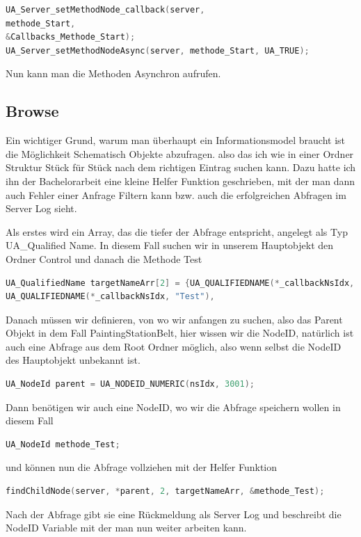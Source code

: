 \begin{lstlisting}[language=C]
UA_Server_setMethodNode_callback(server,
methode_Start,
&Callbacks_Methode_Start);
UA_Server_setMethodNodeAsync(server, methode_Start, UA_TRUE);
\end{lstlisting}

Nun kann man die Methoden Asynchron aufrufen.

\subsection{Browse}
Ein wichtiger Grund, warum man überhaupt ein Informationsmodel braucht ist die Möglichkeit Schematisch Objekte abzufragen. also das ich wie in einer Ordner Struktur Stück für Stück nach dem richtigen Eintrag suchen kann. Dazu hatte ich ihn der Bachelorarbeit eine kleine Helfer Funktion geschrieben, mit der man dann auch Fehler einer Anfrage Filtern kann bzw. auch die erfolgreichen Abfragen im Server Log sieht.

Als erstes wird ein Array, das die tiefer der Abfrage entspricht, angelegt als Typ UA\_Qualified Name. In diesem Fall suchen wir in unserem Hauptobjekt den Ordner Control und danach die Methode Test

\begin{lstlisting}[language=C]
UA_QualifiedName targetNameArr[2] = {UA_QUALIFIEDNAME(*_callbackNsIdx, "Control"), 
UA_QUALIFIEDNAME(*_callbackNsIdx, "Test"), 
\end{lstlisting}
Danach müssen wir definieren, von wo wir anfangen zu suchen, also das Parent Objekt in dem Fall PaintingStationBelt, hier wissen wir die NodeID, natürlich ist auch eine Abfrage aus dem Root Ordner möglich, also wenn selbst die NodeID des Hauptobjekt unbekannt ist.
\begin{lstlisting}[language=C]
UA_NodeId parent = UA_NODEID_NUMERIC(nsIdx, 3001);
\end{lstlisting}
Dann benötigen wir auch eine NodeID, wo wir die Abfrage speichern wollen in diesem Fall 
\begin{lstlisting}[language=C]
UA_NodeId methode_Test;
\end{lstlisting}
und können nun die Abfrage vollziehen mit der Helfer Funktion
\begin{lstlisting}[language=C]
findChildNode(server, *parent, 2, targetNameArr, &methode_Test);
\end{lstlisting}
Nach der Abfrage gibt sie eine Rückmeldung als Server Log und beschreibt die NodeID Variable mit der man nun weiter arbeiten kann.

